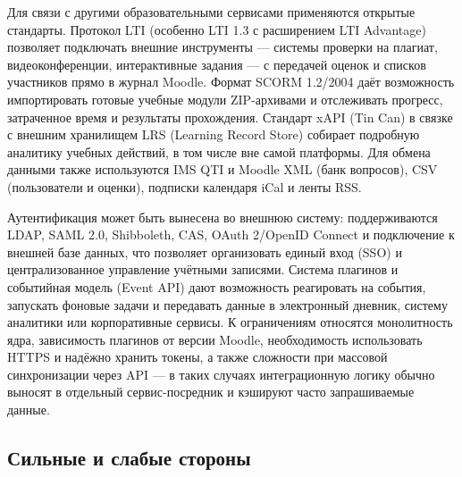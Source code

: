 \documentclass[a4paper, 14pt]{extarticle}
\begin{document}
Для связи с другими образовательными сервисами применяются открытые стандарты. Протокол LTI (особенно LTI 1.3 с расширением LTI Advantage) позволяет подключать внешние инструменты — системы проверки на плагиат, видеоконференции, интерактивные задания — с передачей оценок и списков участников прямо в журнал Moodle. Формат SCORM 1.2/2004 даёт возможность импортировать готовые учебные модули ZIP-архивами и отслеживать прогресс, затраченное время и результаты прохождения. Стандарт xAPI (Tin Can) в связке с внешним хранилищем LRS (Learning Record Store) собирает подробную аналитику учебных действий, в том числе вне самой платформы. Для обмена данными также используются IMS QTI и Moodle XML (банк вопросов), CSV (пользователи и оценки), подписки календаря iCal и ленты RSS.

Аутентификация может быть вынесена во внешнюю систему: поддерживаются LDAP, SAML 2.0, Shibboleth, CAS, OAuth 2/OpenID Connect и подключение к внешней базе данных, что позволяет организовать единый вход (SSO) и централизованное управление учётными записями. Система плагинов и событийная модель (Event API) дают возможность реагировать на события, запускать фоновые задачи и передавать данные в электронный дневник, систему аналитики или корпоративные сервисы. К ограничениям относятся монолитность ядра, зависимость плагинов от версии Moodle, необходимость использовать HTTPS и надёжно хранить токены, а также сложности при массовой синхронизации через API — в таких случаях интеграционную логику обычно выносят в отдельный сервис-посредник и кэшируют часто запрашиваемые данные.

\subsection{Сильные и слабые стороны}


\end{document}
